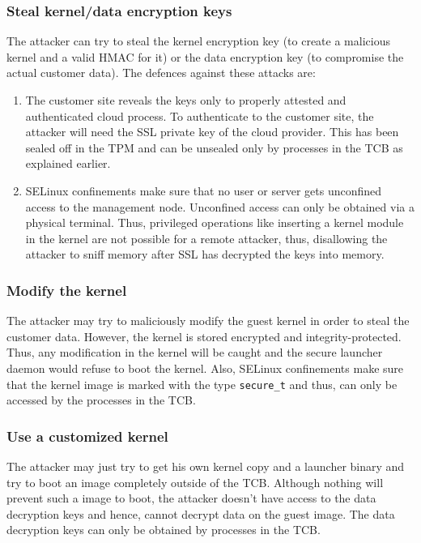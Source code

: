 \documentclass[10pt,twocolumn,pdftex]{article}
\begin{document}
\subsubsection{Steal kernel/data encryption keys}
The attacker can try to steal the kernel encryption key (to create a malicious kernel and a valid HMAC for it) or the data encryption key (to compromise the actual customer data). The defences against these attacks are:
\begin{enumerate}
\item The customer site reveals the keys only to properly attested and authenticated cloud process. To authenticate to the customer site, the attacker will need the SSL private key of the cloud provider. This has been sealed off in the TPM and can be unsealed only by processes in the TCB as explained earlier. 
\item SELinux confinements make sure that no user or server gets unconfined access to the management node. Unconfined access can only be obtained via a physical terminal. Thus, privileged operations like inserting a kernel module in the kernel are not possible for a remote attacker, thus, disallowing the attacker to sniff memory after SSL has decrypted the keys into memory.
\end{enumerate}

\subsubsection{Modify the kernel}
The attacker may try to maliciously modify the guest kernel in order to steal the customer data. However, the kernel is stored encrypted and integrity-protected. Thus, any modification in the kernel will be caught and the secure launcher daemon would refuse to boot the kernel. Also, SELinux confinements make sure that the kernel image is marked with the type {\tt secure\_t} and thus, can only be accessed by the processes in the TCB.

\subsubsection{Use a customized kernel}
The attacker may just try to get his own kernel copy and a launcher binary and try to boot an image completely outside of the TCB. Although nothing will prevent such a image to boot, the attacker doesn't have access to the data decryption keys and hence, cannot decrypt data on the guest image. The data decryption keys can only be obtained by processes in the TCB.
\end{document}
